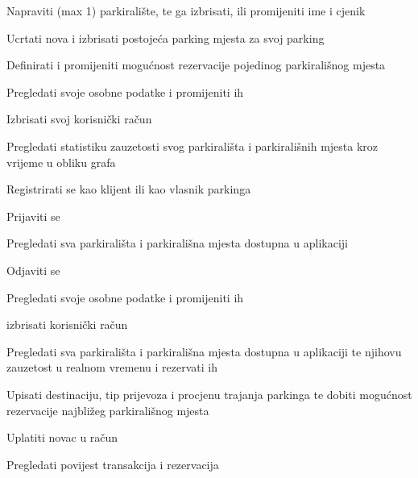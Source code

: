 			
			\begin{packed_enum}
				\item  {}
				
				\begin{packed_enum}
					
					\item Napraviti (max 1) parkiralište, te ga izbrisati, ili promijeniti ime i cjenik
					\item Ucrtati nova i izbrisati postojeća parking mjesta za svoj parking
					\item Definirati i promijeniti mogućnost rezervacije pojedinog parkirališnog mjesta
					\item Pregledati svoje osobne podatke i promijeniti ih
					\item Izbrisati svoj korisnički račun
					\item Pregledati statistiku zauzetosti svog parkirališta i parkirališnih mjesta kroz vrijeme u obliku grafa
					
				\end{packed_enum}
			
				\item  {}
				
				\begin{packed_enum}
					
					\item Registrirati se kao klijent ili kao vlasnik parkinga
					\item Prijaviti se
					\item Pregledati sva parkirališta i parkirališna mjesta dostupna u aplikaciji
					
				\end{packed_enum}
			
				\item  {}
				
				\begin{packed_enum}
					
					\item Odjaviti se
					\item Pregledati svoje osobne podatke i promijeniti ih
					\item izbrisati korisnički račun
					\item Pregledati sva parkirališta i parkirališna mjesta dostupna u aplikaciji te njihovu zauzetost u realnom vremenu i rezervati ih
					\item Upisati destinaciju, tip prijevoza i procjenu trajanja parkinga te dobiti mogućnost rezervacije najbližeg parkirališnog mjesta
					\item Uplatiti novac u račun
					\item Pregledati povijest transakcija i rezervacija
					

\end{packed_enum}
\end{packed_enum}
